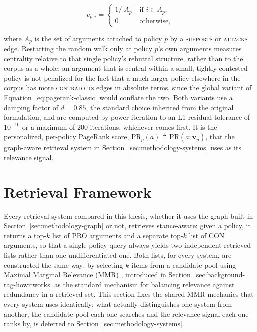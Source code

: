 \begin{equation}
v_{p,i} =
\begin{cases}
1 / |A_p| & \text{if } i \in A_p, \\
0 & \text{otherwise},
\end{cases}
\label{eq:pagerank-personalized}
\end{equation}

\noindent where $A_p$ is the set of arguments attached to policy $p$ by a \textsc{supports} or
\textsc{attacks} edge. Restarting the random walk only at policy $p$'s own arguments measures
centrality relative to that single policy's rebuttal structure, rather than to the corpus as a
whole; an argument that is central within a small, tightly contested policy is not penalized for
the fact that a much larger policy elsewhere in the corpus has more \textsc{contradicts} edges in
absolute terms, since the global variant of Equation~\ref{eq:pagerank-classic} would conflate the
two. Both variants use a damping factor of $d=0.85$, the standard choice inherited from the
original formulation, and are computed by power iteration to an L1 residual tolerance of
$10^{-10}$ or a maximum of 200 iterations, whichever comes first. It is the personalized,
per-policy PageRank score, $\mathrm{PR}_p(a) \triangleq \mathrm{PR}(a; \mathbf{v}_p)$, that the
graph-aware retrieval system in Section~\ref{sec:methodology-systems} uses as its relevance
signal.

\section{Retrieval Framework}
\label{sec:methodology-retrieval-framework}

Every retrieval system compared in this thesis, whether it uses the graph built in
Section~\ref{sec:methodology-graph} or not, retrieves stance-aware: given a policy, it returns a
top-$k$ list of PRO arguments and a separate top-$k$ list of CON arguments, so that a single
policy query always yields two independent retrieved lists rather than one undifferentiated one.
Both lists, for every system, are constructed the same way: by selecting $k$ items from a
candidate pool using Maximal Marginal Relevance (MMR) \cite{carbonell1998mmr}, introduced in
Section~\ref{sec:background-rag-howitworks} as the standard mechanism for balancing relevance
against redundancy in a retrieved set. This section fixes the shared MMR mechanics that every
system uses identically; what actually distinguishes one system from another, the candidate pool
each one searches and the relevance signal each one ranks by, is deferred to
Section~\ref{sec:methodology-systems}.

